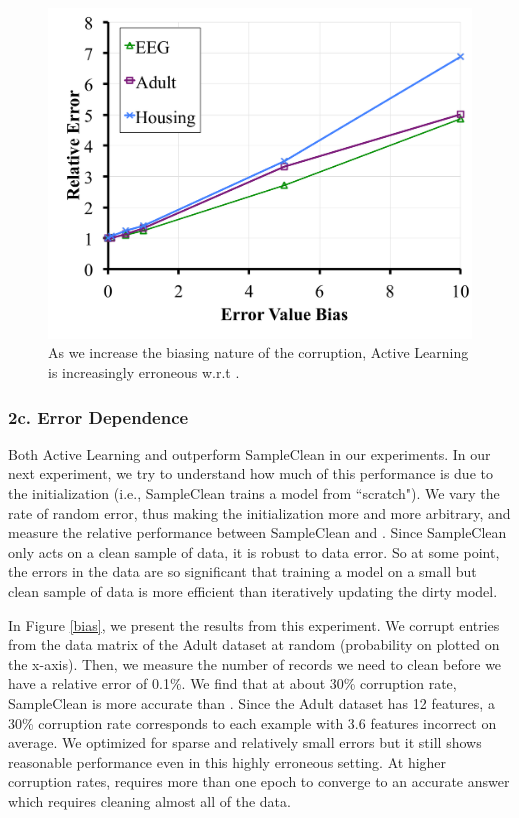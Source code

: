 \begin{figure}[ht!]
\centering
 \includegraphics[width=0.6\columnwidth]{exp/exp10.pdf}
 \caption{As we increase the biasing nature of the corruption, Active Learning is increasingly erroneous w.r.t \sys. \label{albias}}
\end{figure}
\fi

\subsubsection{2c. Error Dependence}
Both Active Learning and \sys outperform SampleClean in our experiments.
In our next experiment, we try to understand how much of this performance 
is due to the initialization (i.e., SampleClean trains a model from ``scratch").
We vary the rate of random error, thus making the initialization more and more arbitrary, 
and measure the relative performance between SampleClean and \sys.
Since SampleClean only acts on a clean sample of data, it is robust to data error.
So at some point, the errors in the data are so significant that training a model on a small but clean sample of data is more efficient than iteratively updating the dirty model.

In Figure \ref{bias}, we present the results from this experiment.
We corrupt entries from the data matrix of the Adult dataset at random (probability on plotted on the x-axis).
Then, we measure the number of records we need to clean before we have a relative error of 0.1\%.
We find that at about 30\% corruption rate, SampleClean is more accurate than \sys.
Since the Adult dataset has 12 features, a 30\% corruption rate corresponds to each example with 3.6 features incorrect on average.
We optimized \sys for sparse and relatively small errors but it still shows reasonable performance even in this highly erroneous setting. 
At higher corruption rates, \sys requires more than one epoch to converge to an accurate answer which requires cleaning almost all of the data.

